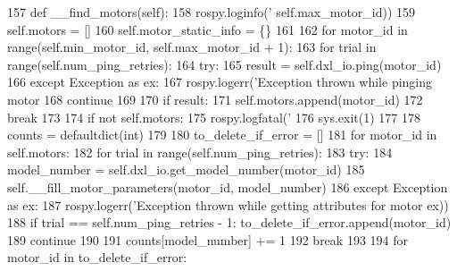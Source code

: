 \begin{DoxyCode}
157     \textcolor{keyword}{def }\_\_find\_motors(self):
158         rospy.loginfo(\textcolor{stringliteral}{'%
      self.max\_motor\_id))
159         self.motors = []
160         self.motor\_static\_info = \{\}
161         
162         \textcolor{keywordflow}{for} motor\_id \textcolor{keywordflow}{in} range(self.min\_motor\_id, self.max\_motor\_id + 1):
163             \textcolor{keywordflow}{for} trial \textcolor{keywordflow}{in} range(self.num\_ping\_retries):
164                 \textcolor{keywordflow}{try}:
165                     result = self.dxl\_io.ping(motor\_id)
166                 \textcolor{keywordflow}{except} Exception \textcolor{keyword}{as} ex:
167                     rospy.logerr(\textcolor{stringliteral}{'Exception thrown while pinging motor %
168                     \textcolor{keywordflow}{continue}
169                     
170                 \textcolor{keywordflow}{if} result:
171                     self.motors.append(motor\_id)
172                     \textcolor{keywordflow}{break}
173                     
174         \textcolor{keywordflow}{if} \textcolor{keywordflow}{not} self.motors:
175             rospy.logfatal(\textcolor{stringliteral}{'%
176             sys.exit(1)
177             
178         counts = defaultdict(int)
179         
180         to\_delete\_if\_error = []
181         \textcolor{keywordflow}{for} motor\_id \textcolor{keywordflow}{in} self.motors:
182             \textcolor{keywordflow}{for} trial \textcolor{keywordflow}{in} range(self.num\_ping\_retries):
183                 \textcolor{keywordflow}{try}:
184                     model\_number = self.dxl\_io.get\_model\_number(motor\_id)
185                     self.\_\_fill\_motor\_parameters(motor\_id, model\_number)
186                 \textcolor{keywordflow}{except} Exception \textcolor{keyword}{as} ex:
187                     rospy.logerr(\textcolor{stringliteral}{'Exception thrown while getting attributes for motor %
       ex))
188                     \textcolor{keywordflow}{if} trial == self.num\_ping\_retries - 1: to\_delete\_if\_error.append(motor\_id)
189                     \textcolor{keywordflow}{continue}
190                     
191                 counts[model\_number] += 1
192                 \textcolor{keywordflow}{break}
193                 
194         \textcolor{keywordflow}{for} motor\_id \textcolor{keywordflow}{in} to\_delete\_if\_error:
}}}}
\end{DoxyCode}
